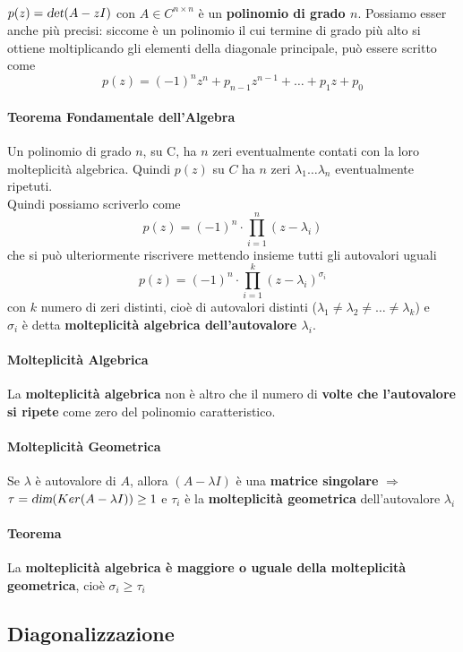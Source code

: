 \documentclass[10pt]{book}
\begin{document}
\paragraph{} $p(z) = \textsl{det}(A - zI)$ con $A \in C^{n \times n}$ è un \textbf{polinomio di grado $n$}. Possiamo esser anche più precisi: siccome è un polinomio il cui termine di grado più alto si ottiene moltiplicando gli elementi della diagonale principale, può essere scritto come $$p(z) = (-1)^n z^n + p_{n-1} z^{n-1} + \ldots + p_1 z + p_0$$
\paragraph{Teorema Fondamentale dell'Algebra} Un polinomio di grado $n$, su C, ha $n$ zeri eventualmente contati con la loro molteplicità algebrica. Quindi $p(z)$ su $C$ ha $n$ zeri $\lambda_1 \ldots \lambda_n$ eventualmente ripetuti.\\
Quindi possiamo scriverlo come $$p(z) = (-1)^n \cdot \prod_{i = 1}^n (z - \lambda_i)$$
che si può ulteriormente riscrivere mettendo insieme tutti gli autovalori uguali
$$p(z) = (-1)^n \cdot \prod_{i = 1}^k (z - \lambda_i)^{\sigma_i}$$ con $k$ numero di zeri distinti, cioè di autovalori distinti ($\lambda_1 \neq \lambda_2 \neq \ldots \neq \lambda_k$) e\\$\sigma_i$ è detta \textbf{molteplicità algebrica dell'autovalore $\lambda_i$}.\\
\paragraph{Molteplicità Algebrica} La \textbf{molteplicità algebrica} non è altro che il numero di \textbf{volte che l'autovalore si ripete} come zero del polinomio caratteristico.
\paragraph{Molteplicità Geometrica} Se $\lambda$ è autovalore di $A$, allora $(A - \lambda I)$ è una \textbf{matrice singolare} $\Rightarrow$\\$\tau = \textsl{dim}(Ker(A - \lambda I)) \geq 1$ e $\tau_i$ è la \textbf{molteplicità geometrica} dell'autovalore $\lambda_i$
\paragraph{Teorema} La \textbf{molteplicità algebrica è maggiore o uguale della molteplicità geometrica}, cioè $\sigma_i \geq \tau_i$
\subsection{Diagonalizzazione}
\end{document}
